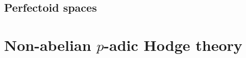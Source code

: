             
            
        \begin{appendices}
            \chapter{Perfectoid spaces}
                \begin{abstract}
                    
                \end{abstract}
                
                \minitoc
                
                
                
                
        \end{appendices}
        
    \part{Non-abelian \texorpdfstring{$p$}{}-adic Hodge theory}
	
	\printbibliography

